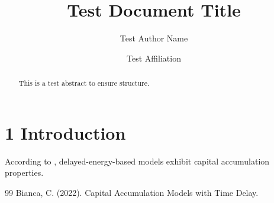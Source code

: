 \documentclass{default}
\begin{document}
\journalheader

\title{Test Document Title}
\author{Test Author Name \and Test Affiliation}
\date{}
\maketitle

\begin{abstract}
This is a test abstract to ensure structure.
\end{abstract}

\section{1 Introduction}

According to \citet{ref1}, delayed-energy-based models exhibit capital accumulation properties.

\begin{thebibliography}{99}
Bianca, C. (2022). Capital Accumulation Models with Time Delay.

\end{thebibliography}
\end{document}
